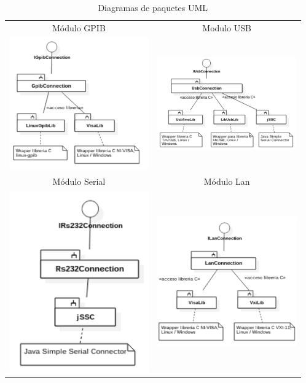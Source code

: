 \documentclass[paper=letter,oneside,fontsize=12pt, parskip=full]{article}
\begin{document}
	\begin{table}[h!]
		\centering 
		\caption{Diagramas de paquetes UML}
		\begin{tabular}{cc}
			Módulo GPIB & Modulo USB \\
			\includegraphics[width=6cm]{Imagenes/GpibConnectionPackageUml.pdf} & 
			\includegraphics[width=6cm]{Imagenes/UsbConnectionPackageUml.pdf} \\	
			Módulo Serial & Módulo Lan \\	
			\includegraphics[width=6cm]{Imagenes/Rs232ConnectionPackageUml.pdf} & 
			\includegraphics[width=6cm]{Imagenes/LanConnectionPackageUml.pdf}					
		\end{tabular}
	\end{table}
\end{document}
